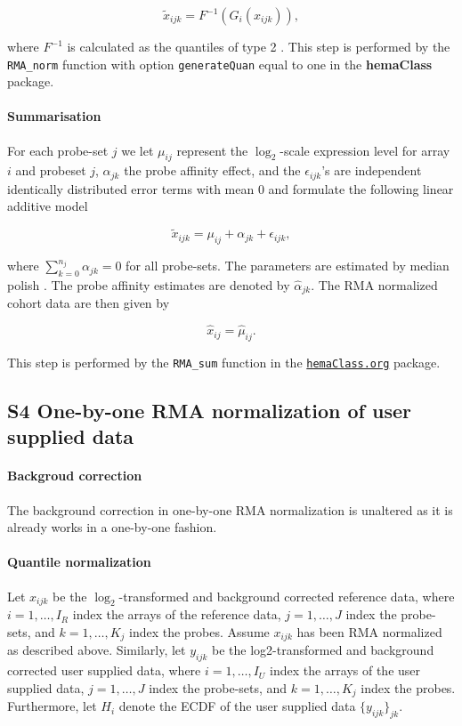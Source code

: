 \documentclass[10pt,letterpaper]{article}
\newcommand{\hemaClass}{\href{http://hemaClass.org}{\texttt{hemaClass.org}}}
\newcommand{\pkg}[1]{\textbf{#1}}
\begin{document}
\begin{equation*}
     \tilde{x}_{ijk} = F^{-1}(G_i(x_{ijk})),
\end{equation*}

where $F^{-1}$ is calculated as the quantiles of type 2 \cite{Hyndman1996}.
This step is performed by the \texttt{RMA\_norm} function with option \texttt{generateQuan} equal to one in the \pkg{hemaClass} package.

\paragraph{Summarisation}
For each probe-set $j$ we let $\mu_{ij}$ represent the $\log_2$-scale expression level for array $i$ and probeset $j$, $\alpha_{jk}$ the probe affinity effect, and the $\epsilon_{ijk}$'s are independent identically distributed  error terms with mean 0 and formulate the following linear additive model

\begin{equation*}
   \tilde{x}_{ijk} = \mu_{ij} + \alpha_{jk}+ \epsilon_{ijk},
\end{equation*}

where $\sum_{k=0}^{n_j} \alpha_{jk} = 0$ for all probe-sets. The parameters are estimated by median polish \cite{Holder2001}. The probe affinity estimates are denoted by $\hat{\alpha}_{jk}$. The RMA normalized cohort data are then given by

\begin{equation*}
   \hat{x}_{ij} = \hat{\mu}_{ij}.
\end{equation*}

This step is performed by the \texttt{RMA\_sum} function in the \hemaClass{} package.


\subsection*{S4 One-by-one RMA normalization of user supplied data}
\paragraph{Backgroud correction}
The background correction in one-by-one RMA normalization is unaltered as it is already works in a one-by-one fashion.

\paragraph{Quantile normalization}
Let $x_{ijk}$ be the $\log_2$-transformed and background corrected reference data, where $i = 1,\dots,I_R$ index the arrays of the reference data, $j=1,\dots,J$ index the probe-sets, and $k=1,\dots,K_j$ index the probes. Assume $x_{ijk}$ has been RMA normalized as described above. Similarly, let $y_{ijk}$ be the log2-transformed and background corrected user supplied data, where $i = 1,\dots,I_U$ index the arrays of the user supplied data, $j=1,\dots,J$  index the probe-sets, and $k=1,\dots,K_j$ index the probes. Furthermore, let $H_i$ denote the ECDF of the user supplied data $\{y_{ijk}\}_{jk}$.
\end{document}
